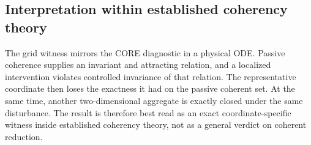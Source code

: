 \subsection{Interpretation within established coherency theory}

The grid witness mirrors the CORE diagnostic in a physical ODE. Passive coherence supplies an invariant and attracting relation, and a localized intervention violates controlled invariance of that relation. The representative coordinate then loses the exactness it had on the passive coherent set. At the same time, another two-dimensional aggregate is exactly closed under the same disturbance. The result is therefore best read as an exact coordinate-specific witness inside established coherency theory, not as a general verdict on coherent reduction.


